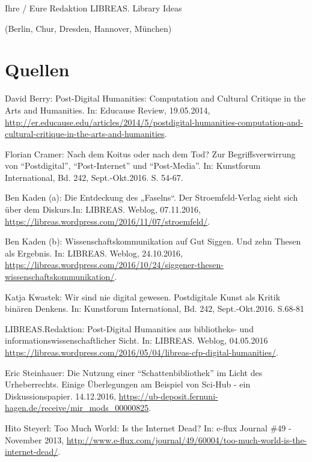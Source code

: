\documentclass[a4paper,
fontsize=11pt,
oneside,
numbers=noperiodatend,
parskip=half-,
bibliography=totoc,
final
]{scrartcl}
\begin{document}
Ihre / Eure Redaktion LIBREAS. Library Ideas

(Berlin, Chur, Dresden, Hannover, München)

\section*{Quellen}\label{quellen}

David Berry: Post-Digital Humanities: Computation and Cultural Critique
in the Arts and Humanities. In: Educause Review, 19.05.2014,
\url{http://er.educause.edu/articles/2014/5/postdigital-humanities-computation-and-cultural-critique-in-the-arts-and-humanities}.

Florian Cramer: Nach dem Koitus oder nach dem Tod? Zur
Begriffsverwirrung von \enquote{Postdigital}, \enquote{Post-Internet}
und \enquote{Post-Media}. In: Kunstforum International, Bd. 242,
Sept.-Okt.2016. S. 54-67.

Ben Kaden (a): Die Entdeckung des „Faselns``. Der Stroemfeld-Verlag
sieht sich über dem Diskurs.In: LIBREAS. Weblog, 07.11.2016,
\url{https://libreas.wordpress.com/2016/11/07/stroemfeld/}.

Ben Kaden (b): Wissenschaftskommunikation auf Gut Siggen. Und zehn
Thesen als Ergebnis. In: LIBREAS. Weblog, 24.10.2016,
\url{https://libreas.wordpress.com/2016/10/24/siggener-thesen-wissenschaftskommunikation/}.

Katja Kwastek: Wir sind nie digital gewesen. Postdigitale Kunst als
Kritik binären Denkens. In: Kunstforum International, Bd. 242,
Sept.-Okt.2016. S.68-81

LIBREAS.Redaktion: Post-Digital Humanities aus bibliotheks- und
informationswissenschaftlicher Sicht. In: LIBREAS. Weblog, 04.05.2016
\url{https://libreas.wordpress.com/2016/05/04/libreas-cfp-digital-humanities/}.

Eric Steinhauer: Die Nutzung einer \enquote{Schattenbibliothek} im Licht
des Urheberrechts. Einige Überlegungen am Beispiel von Sci-Hub - ein
Diskussionspapier. 14.12.2016,
\url{https://ub-deposit.fernuni-hagen.de/receive/mir_mods_00000825}.

Hito Steyerl: Too Much World: Is the Internet Dead? In: e-flux Journal
\#49 - November 2013,
\url{http://www.e-flux.com/journal/49/60004/too-much-world-is-the-internet-dead/}.

\end{document}
